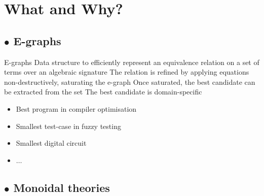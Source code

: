 \documentclass[aspectratio=169]{beamer}
\newcommand{\bsubsection}[1]{\subsection{$\bullet$ #1}}
\begin{document}
\section{What and Why?}
\bsubsection{E-graphs}

\begin{frame}{E-graphs}
    Data structure to \alert{efficiently} represent an equivalence relation on a set of terms over an \alert{algebraic} signature
    \pause
    \vfill
    \pause
    The relation is refined by applying equations \alert{non-destructively}, \alert{saturating} the e-graph
    \vfill
    \pause
    Once saturated, the \alert{best} candidate can be extracted from the set
    \vfill
    \pause
    The \alert{best} candidate is domain-specific
    \begin{itemize}
        \item Best program in compiler optimisation
        \item Smallest test-case in fuzzy testing
        \item Smallest digital circuit
        \item $\ldots$
    \end{itemize}
    \vfill
\end{frame}

\bsubsection{Monoidal theories}
\end{document}
